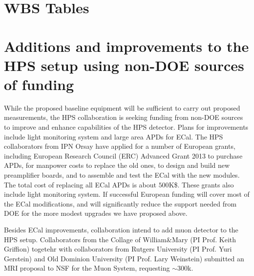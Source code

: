 \appendix
\renewcommand*{\thesubsection}{\thesection.\arabic{subsection}}
\renewcommand*{\thesubsubsection}{\thesubsection.\arabic{subsubsection}}

\section{WBS Tables}
\label{sec:wbs}




\section{Additions and improvements to the HPS setup using non-DOE sources of funding}

While the proposed baseline equipment will be sufficient to carry out proposed measurements, the HPS collaboration is seeking funding from non-DOE sources to improve and enhance capabilities of the HPS detector. Plans for improvements include light monitoring system and large area APDs for ECal.  The HPS collaborators from IPN Orsay have applied for a number of European grants, including European Research Council (ERC) Advanced Grant 2013 to purchase APDs, for manpower costs to replace the old ones, to design and build 
new preamplifier boards, and to assemble and test the ECal with the new modules. The total cost of replacing all ECal APDs is about $500$K\$. 
These grants also include light monitoring system. If successful European funding will cover most of the ECal modifications, and will significantly reduce the support needed from DOE for the more modest upgrades we have proposed above. 

Besides ECal improvements, collaboration intend to add muon detector to the HPS setup. Collaborators from the Collage of William\&Mary (PI Prof. Keith Griffion) togetehr with collaborators from Rutgers University (PI Prof. Yuri Gerstein) and Old Dominion University (PI Prof. Lary Weinstein) submitted an MRI proposal to NSF for the Muon System, requesting $\sim 300$k.  

